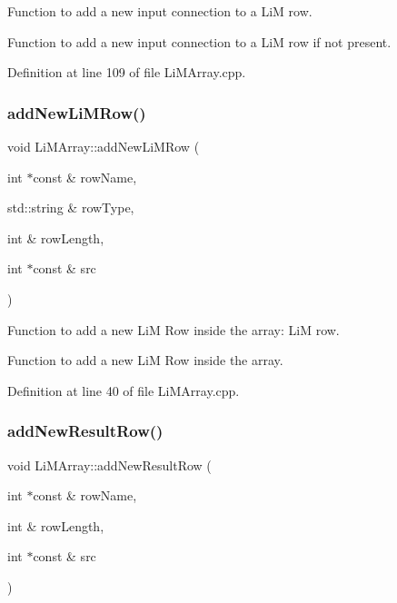 Function to add a new input connection to a LiM row. 

Function to add a new input connection to a LiM row if not present. 

Definition at line 109 of file Li\+M\+Array.\+cpp.

\mbox{\label{classoctantis_1_1LiMArray_a3c9c115f7ea64d10b10bb8be669e98ad}} 
\subsubsection{\texorpdfstring{add\+New\+Li\+M\+Row()}{addNewLiMRow()}}
{\footnotesize\ttfamily void Li\+M\+Array\+::add\+New\+Li\+M\+Row (\begin{DoxyParamCaption}\item[{int $\ast$const \&}]{row\+Name,  }\item[{std\+::string \&}]{row\+Type,  }\item[{int \&}]{row\+Length,  }\item[{int $\ast$const \&}]{src }\end{DoxyParamCaption})}



Function to add a new LiM Row inside the array\+: LiM row. 

Function to add a new LiM Row inside the array. 

Definition at line 40 of file Li\+M\+Array.\+cpp.

\mbox{\label{classoctantis_1_1LiMArray_a37a3335b4bdddc1e7c8fc5a2de5ec226}} 
\subsubsection{\texorpdfstring{add\+New\+Result\+Row()}{addNewResultRow()}}
{\footnotesize\ttfamily void Li\+M\+Array\+::add\+New\+Result\+Row (\begin{DoxyParamCaption}\item[{int $\ast$const \&}]{row\+Name,  }\item[{int \&}]{row\+Length,  }\item[{int $\ast$const \&}]{src }\end{DoxyParamCaption})}



